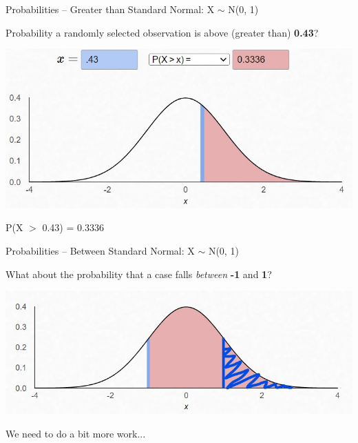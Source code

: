 \documentclass{beamer}
\begin{document}
\begin{frame}{Probabilities -- Greater than}
Standard Normal: X $\sim$ N(0, 1)

Probability a randomly selected observation is above (greater than) \textbf{0.43}?
\begin{center}
    \includegraphics[scale=.7]{img/norm_prob2.jpg}
\end{center}
P(X $>$ 0.43) = 0.3336
\end{frame}

\begin{frame}{Probabilities -- Between}
Standard Normal: X $\sim$ N(0, 1)

What about the probability that a case falls \textit{between} \textbf{-1} and \textbf{1}?
\begin{center}
    \includegraphics[scale=.7]{img/norm_prob3.jpg}
\end{center}
We need to do a bit more work...
\end{frame}
\end{document}
